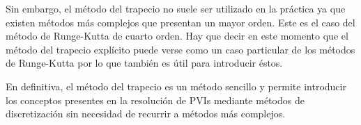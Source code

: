 \documentclass{article}
\theoremstyle{theorem-style}  %
\theoremstyle{definition-style}
\theoremstyle{example-style}
\begin{document}
	Sin embargo, el método del trapecio no suele ser utilizado en la práctica \cite{Butcher} ya que existen métodos más complejos que presentan un mayor orden. Este es el caso del método de Runge-Kutta de cuarto orden. Hay que decir en este momento que el método del trapecio explícito puede verse como un caso particular de los métodos de Runge-Kutta por lo que también es útil para introducir éstos.

	En definitiva, el método del trapecio es un método sencillo y permite introducir los conceptos presentes en la resolución de PVIs mediante métodos de discretización sin necesidad de recurrir a métodos más complejos.


\printbibliography
\end{document}
